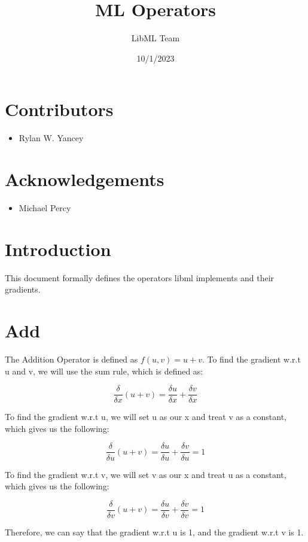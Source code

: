 \documentclass{article}
\title{ML Operators}
\author{LibML Team}
\date{10/1/2023}
\begin{document}
    \maketitle
    \section*{Contributors}
        \begin{itemize}
            \item Rylan W. Yancey
        \end{itemize}
    \section*{Acknowledgements}
        \begin{itemize}
            \item Michael Percy
        \end{itemize}
    \section*{Introduction}
        This document formally defines the operators libml implements and their gradients. 

\noindent\makebox[\linewidth]{\rule{\paperwidth}{0.4pt}}
    \section{Add}
        The Addition Operator is defined as $f(u,v) = u + v$. To find the gradient w.r.t u and v, 
        we will use the sum rule, which is defined as: 

        $$\frac{\delta}{\delta{x}}(u + v) = \frac{\delta{u}}{\delta{x}} + \frac{\delta{v}}{\delta{x}}$$

        To find the gradient w.r.t u, we will set u as our x and treat v as a constant, 
        which gives us the following:

        $$\frac{\delta}{\delta{u}}(u + v) = \frac{\delta{u}}{\delta{u}} + \frac{\delta{v}}{\delta{u}} = 1$$

        To find the gradient w.r.t v, we will set v as our x and treat u as a constant, 
        which gives us the following:

        $$\frac{\delta}{\delta{v}}(u + v) = \frac{\delta{u}}{\delta{v}} + \frac{\delta{v}}{\delta{v}} = 1$$

        Therefore, we can say that the gradient w.r.t u is 1, and the gradient w.r.t v is 1.
\end{document}
